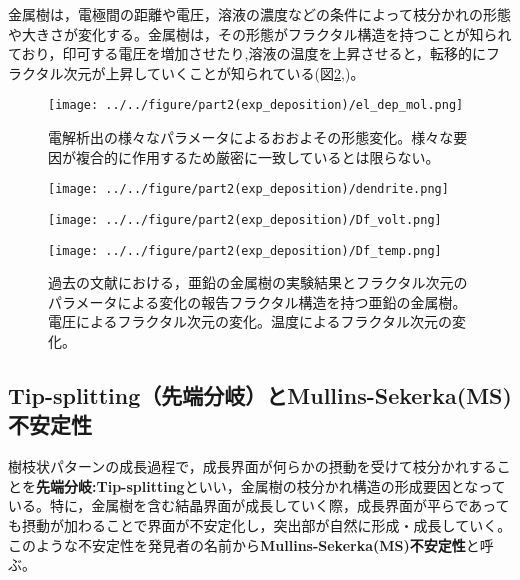 \documentclass[autodetect-engine,dvi=dvipdfmx,a4paper,ja=standard,oneside,openany,11pt,draft]{bxjsbook}
\begin{document}
金属樹は，電極間の距離や電圧，溶液の濃度などの条件によって枝分かれの形態や大きさが変化する。金属樹は，その形態がフラクタル構造を持つことが知られており\cite{matsushita1984fractal}，印可する電圧を増加させたり\cite{matsushita1984fractal},溶液の温度を上昇させると\cite{suda2003temperature}，転移的にフラクタル次元が上昇していくことが知られている(図\ref{fig:fractal_dimension},)。
\begin{figure}[htbp]
  \centering
  \texttt{[image: ../../figure/part2(exp\_deposition)/el\_dep\_mol.png]}
  \caption{電解析出の様々なパラメータによるおおよその形態変化。様々な要因が複合的に作用するため厳密に一致しているとは限らない。}
  \label{fig:el_dep_mol}
\end{figure}

\begin{figure}[htbp]
  \begin{minipage}{0.28\textwidth}
    \subcaption{}
    \centering
    \texttt{[image: ../../figure/part2(exp\_deposition)/dendrite.png]}
    \label{fig:el_dep_fractal}
  \end{minipage}
  \begin{minipage}
    {0.35\textwidth}
    \subcaption{}
    \centering
    \texttt{[image: ../../figure/part2(exp\_deposition)/Df\_volt.png]}
    \label{fig:Df_volt}
  \end{minipage}
  \begin{minipage}
    {0.35\textwidth}
    \subcaption{}
    \centering
    \texttt{[image: ../../figure/part2(exp\_deposition)/Df\_temp.png]}
    \label{fig:Df_temp}
  \end{minipage}
  \caption{過去の文献における，亜鉛の金属樹の実験結果とフラクタル次元のパラメータによる変化の報告フラクタル構造を持つ亜鉛の金属樹\cite{matsushita1984fractal}。電圧によるフラクタル次元の変化\cite{matsushita1984fractal}。温度によるフラクタル次元の変化\cite{suda2003temperature}。}
  \label{fig:fractal_dimension}
\end{figure}

\subsection{Tip-splitting（先端分岐）とMullins-Sekerka(MS)不安定性}
\label{sec:tip_splitting}
樹枝状パターンの成長過程で，成長界面が何らかの摂動を受けて枝分かれすることを\textbf{先端分岐:Tip-splitting}といい，金属樹の枝分かれ構造の形成要因となっている。特に，金属樹を含む結晶界面が成長していく際，成長界面が平らであっても摂動が加わることで界面が不安定化し，突出部が自然に形成・成長していく。このような不安定性を発見者の名前から\textbf{Mullins-Sekerka(MS)不安定性}と呼ぶ。
\end{document}
